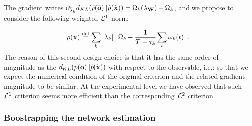 The gradient writes $\partial_{\tilde{\lambda}_k} d_{KL}(\bar{p}(\bar{\bf o})\|\tilde{p}(\tilde{\bf x})) = \tilde{\Omega}_{k}(\tilde{\bf \lambda}_{\bf W}) - \bar{\Omega}_{k}$, and we propose to consider the following weighted ${\cal L}^1$ norm:
\begin{equation} \label{kl-criterion} \rho({\bf x}) \stackrel {\rm def}{=} \sum_k |\bar{\lambda}_k| \, \left|\bar{\Omega}_{k} - \frac{1}{T-\tau_k} \sum_t \omega_k(t)\right|. \end{equation}
The reason of this second design choice is that it has the same order of magnitude as the $d_{KL}(\bar{p}(\bar{\bf o})\|\tilde{p}(\tilde{\bf x}))$ with respect to the observable, i.e.:
so that we expect the numerical condition of the original criterion and the related gradient magnitude to be similar. At the experimental level we have observed that such ${\cal L}^1$ criterion seems more efficient than the corresponding ${\cal L}^2$ criterion.

\subsubsection*{Boostrapping the network estimation}

